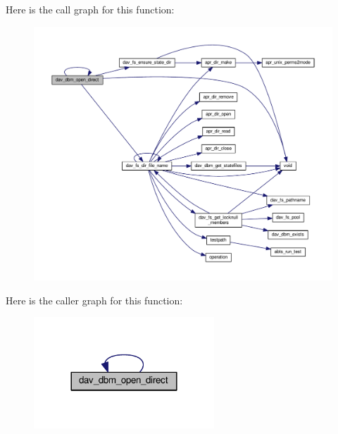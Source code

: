 Here is the call graph for this function\+:
\nopagebreak
\begin{figure}[H]
\begin{center}
\leavevmode
\includegraphics[width=350pt]{group__MOD__DAV_gad4cb194ad9a9407ec27942bd56c82638_cgraph}
\end{center}
\end{figure}




Here is the caller graph for this function\+:
\nopagebreak
\begin{figure}[H]
\begin{center}
\leavevmode
\includegraphics[width=192pt]{group__MOD__DAV_gad4cb194ad9a9407ec27942bd56c82638_icgraph}
\end{center}
\end{figure}


